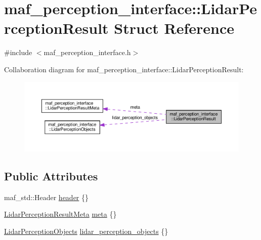 \hypertarget{structmaf__perception__interface_1_1LidarPerceptionResult}{}\section{maf\+\_\+perception\+\_\+interface\+:\+:Lidar\+Perception\+Result Struct Reference}
\label{structmaf__perception__interface_1_1LidarPerceptionResult}


{\ttfamily \#include $<$maf\+\_\+perception\+\_\+interface.\+h$>$}



Collaboration diagram for maf\+\_\+perception\+\_\+interface\+:\+:Lidar\+Perception\+Result\+:\nopagebreak
\begin{figure}[H]
\begin{center}
\leavevmode
\includegraphics[width=350pt]{structmaf__perception__interface_1_1LidarPerceptionResult__coll__graph}
\end{center}
\end{figure}
\subsection*{Public Attributes}
\begin{DoxyCompactItemize}
\item 
maf\+\_\+std\+::\+Header \hyperlink{structmaf__perception__interface_1_1LidarPerceptionResult_aee130bf89420b185560e3982eb391708}{header} \{\}
\item 
\hyperlink{structmaf__perception__interface_1_1LidarPerceptionResultMeta}{Lidar\+Perception\+Result\+Meta} \hyperlink{structmaf__perception__interface_1_1LidarPerceptionResult_a2a369ce941c3119f213207f0cc998afb}{meta} \{\}
\item 
\hyperlink{structmaf__perception__interface_1_1LidarPerceptionObjects}{Lidar\+Perception\+Objects} \hyperlink{structmaf__perception__interface_1_1LidarPerceptionResult_a1f3195a0257fbe4a2cd5be76c389e9e5}{lidar\+\_\+perception\+\_\+objects} \{\}
\end{DoxyCompactItemize}


